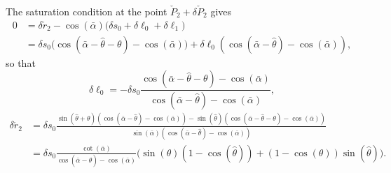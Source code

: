 \documentclass[reqno]{amsart}
\theoremstyle{definition} \newtheorem{definition}{Definition}[section]
\theoremstyle{definition} \newtheorem{remark}[definition]{Remark}
\theoremstyle{plain} \newtheorem{lemma}[definition]{Lemma}
\theoremstyle{plain} \newtheorem{proposition}[definition]{Proposition}
\theoremstyle{plain} \newtheorem{theorem}[definition]{Theorem}
\theoremstyle{plain} \newtheorem{corollary}[definition]{Corollary}
\theoremstyle{definition} \newtheorem{example}[definition]{Example}
\theoremstyle{plain} \newtheorem{claim}[clai]{Claim}
\theoremstyle{definition} \newtheorem{assumption}[definition]{Assumption}
\theoremstyle{definition} \newtheorem{observation}[definition]{Observation}
\newcommand{\1}{\mathbbm 1}
\numberwithin{equation}{section} %
\theoremstyle{plain} \newtheorem*{theorem*}{Theorem}
\theoremstyle{plain} \newtheorem{mthm}[maintheorem]{Main Theorem}
\theoremstyle{plain} \newtheorem*{mthm*}{Main Theorem}
\theoremstyle{plain} \newtheorem*{conjecture*}{Conjecture}
\theoremstyle{plain} \newtheorem{conjecture}[definition]{Conjecture}
\theoremstyle{plain} \newtheorem*{problem*}{Problem}
\begin{document}
The saturation condition at the point $\check P_2 + \delta \check P_2$ gives
\begin{align*}
0 &= \delta \check r_2 - \cos(\bar \alpha) \big( \delta s_0 + \delta \ell_0 + \delta \ell_1 \big) \\
&= \delta s_0 \big( \cos(\bar \alpha - \hat \theta - \theta) - \cos(\bar \alpha) \big) + \delta \ell_0 ( \cos(\bar \alpha - \hat \theta) - \cos(\bar \alpha)),
\end{align*}
so that
\begin{equation*}
\delta \ell_0 = - \delta s_0 \frac{\cos(\bar \alpha - \hat \theta - \theta) - \cos(\bar \alpha)}{\cos(\bar \alpha - \hat \theta) - \cos(\bar \alpha)},
\end{equation*}
\begin{align*}
\delta \check r_2 &= \delta s_0 \frac{\sin(\hat \theta + \theta) (\cos(\bar \alpha - \hat \theta) - \cos(\bar \alpha)) - \sin(\hat \theta) (\cos(\bar \alpha - \hat \theta - \theta) - \cos(\bar \alpha))}{\sin(\bar \alpha) (\cos(\bar \alpha - \hat \theta) - \cos(\bar \alpha))} \\
&= \delta s_0 \frac{\cot(\bar \alpha)}{\cos(\bar \alpha - \hat \theta) - \cos(\bar \alpha)} \big( \sin(\theta) (1 - \cos(\hat \theta)) + (1 - \cos(\theta)) \sin(\hat \theta) \big).
\end{align*}
\end{document}
